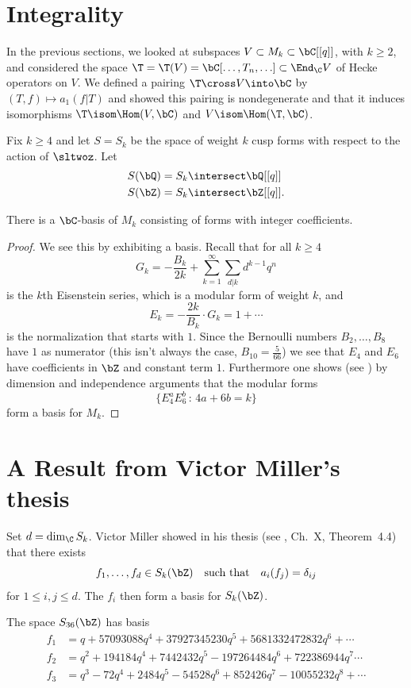 \documentclass{report}
\begin{document}
\section{Integrality}
In the previous sections, we looked at subspaces
$V \subset M_k \subset \bC[[q]]$, with $k\geq 2$, and considered the
space $\T=\T(V)=\bC[\ldots,T_n,\ldots]\subset\End_{\C}V$
of Hecke operators on $V$. We defined a pairing
$\T\cross V\into \bC$ by $(T,f)\mapsto a_1(f|T)$ and
showed this pairing is nondegenerate and that
it induces isomorphisms
$\T\isom\Hom(V,\bC)$ and $V\isom\Hom(\T,\bC)$.


Fix $k\geq 4$ and let $S=S_k$ be the space of weight $k$
cusp forms with respect to the action of $\sltwoz$. Let
\begin{align*}
S(\bQ)& =S_k\intersect \bQ[[q]]\\
S(\bZ)& = S_k\intersect \bZ[[q]].
\end{align*}

\begin{theorem}\label{thm:Mkinteger}
There is a $\bC$-basis of $M_k$ consisting of forms
with integer coefficients.
\end{theorem}
\begin{proof}
We see this by
exhibiting a basis. Recall that for all $k\geq 4$
$$G_k=-\frac{B_k}{2k}+\sum_{k=1}^{\infty}\sum_{d|k}d^{k-1}q^n$$
is the $k$th Eisenstein series,
which is a modular form of weight $k$, and
$$E_k=-\frac{2k}{B_k}\cdot G_k=1+\cdots$$
is the normalization that starts with $1$. Since the Bernoulli numbers
$B_2,\ldots,B_8$ have $1$ as numerator (this isn't always the case,
$B_{10}=\frac{5}{66}$) we see that $E_4$ and $E_6$ have coefficients
in $\bZ$ and constant term $1$. Furthermore one shows (see
\cite[\S{}VII.3.2]{serre:arithmetic}) by dimension and
independence arguments that the modular forms
$$\{E_4^aE_6^b \, :\, 4a+6b=k\}$$
form a basis for $M_k$.
\end{proof}

\section{A Result from Victor Miller's thesis}
Set $d=\dim_{\C}S_k$. Victor Miller showed in his thesis (see
\cite{lang:modular}, Ch.~X, Theorem~4.4) that there exists
$$f_1,\ldots,f_d\in S_k(\bZ) \quad\text{such that}\quad a_i(f_j)=\delta_{ij}$$
for $1\leq i,j\leq d$. The $f_i$ then form a basis
for $S_k(\bZ)$.

\begin{example}
The space $S_{36}(\bZ)$ has basis
\begin{align*}
f_1 &= q + 57093088q^4 + 37927345230q^5 + 5681332472832q^6 +  \cdots\\
f_2 &= q^2 + 194184q^4 + 7442432q^5 - 197264484q^6 + 722386944q^7  \cdots\\
f_3 &= q^3 - 72q^4 + 2484q^5 - 54528q^6 + 852426q^7 - 10055232q^8 +  \cdots
\end{align*}
\end{example}
\end{document}
